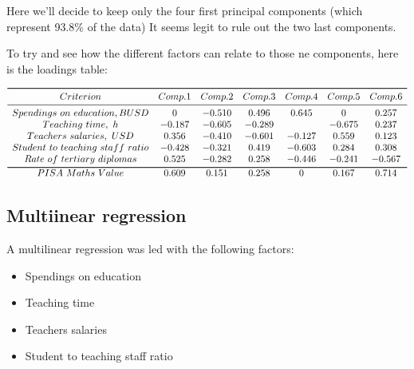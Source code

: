 \documentclass[12pt,a4paper]{article}
\begin{document}
Here we'll decide to keep only the four first principal components (which represent 93.8\% of the data)
It seems legit to rule out the two last components.

To try and see how the different factors can relate to those ne components, here is the loadings table:

\begin{table}[h]
	\centering
	$\begin{array} {*{7}{c}}
		\toprule
		Criterion & Comp.1 & Comp.2 & Comp.3 & Comp.4 & Comp.5 & Comp.6 \\
		\midrule
		Spendings~on~education, B USD & 0 & -0.510 & 0.496 & 0.645 & 0 & 0.257 \\
		Teaching~time,~h & -0.187 & -0.605 & -0.289 & & -0.675 & 0.237 \\
		Teachers~salaries,~USD & 0.356 & -0.410 & -0.601 & -0.127 & 0.559 & 0.123 \\
		Student~to~teaching~staff~ratio & -0.428 & -0.321 & 0.419 & -0.603 & 0.284 & 0.308 \\
		Rate~of~tertiary~diplomas & 0.525 & -0.282 & 0.258 & -0.446 & -0.241 & -0.567 \\
		\bottomrule
		PISA~Maths~Value & 0.609 & 0.151 & 0.258 & 0 & 0.167 & 0.714 \\
	\end{array}$
\end{table}

\subsection{Multiinear regression}

A multilinear regression was led with the following factors:
\begin{itemize}
	\item Spendings on education
	\item Teaching time
	\item Teachers salaries
	\item Student to teaching staff ratio
\end{itemize}
\end{document}
